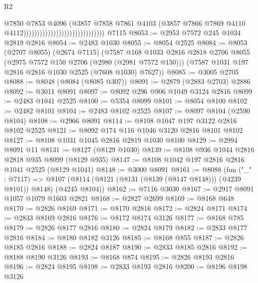 \begin{lexlean}{R2}
\begin{coremodule}
                                                            @7850
                                                            @7853
                                                            @4096
                                                            (@3857
                                                              @7858
                                                              @7861
                                                              @4103
                                                              (@3857
                                                                @7866
                                                                @7869
                                                                @4110
                                                                @4112))))))))))))))))))))))))))))))
    @7115
@8053 := @2953 @7572 @245 @1034 @2819 @2816
@8054 := @2483 @1030
@8055 := @8054 @2525
@8084 := @8053
    (@2707 @8055)
    (@2674 @7115)
    (@7587
      @168
      @1033
      @2816
      @2818
      @2706
      @8055
      (@2975 @7572 @150 @2706 (@2980 (@2981 @7572 @150)))
      (@7587 @1031 @197 @2816 @2816 @1030 @2525 (@7608 @1030) @7627))
@8085 := @3005 @2705
@8088 := @8048 (@8084 (@8085 @307))
@8091 := @2879 (@2883 @2703) @2886
@8092 := @3011 @8091
@8097 := @8092 @296 @906 @1049 @3124 @2816
@8099 := @2483 @1041 @2525
@8100 := @5354 @8099
@8101 := @8054 @8100
@8102 := @2482 @8101
@8104 := @2483 @8102 @2525
@8107 := @8097 @8104 (@2590 @8104)
@8108 := @2966 @8091
@8114 := @8108 @1047 @197 @3122 @2816 @8102 @2525
@8121 := @8092 @174 @116 @1046 @3120 @2816 @8101 @8102
@8127 := @8108 @1031 @1045 @2816 @2819 @1030 @8100
@8129 := @2994 @8091 @11
@8131 := @8127 (@8129 @1030)
@8139 := @8108 @936 @1044 @2816 @2818 @935 @8099 (@8129 @935)
@8147 := @8108 @1042 @197 @2816 @2816 @1041 @2525 (@8129 @1041)
@8148 := @3000 @8091
@8161 := @8088
    (fun ("_" : @7117) =>
    @8107 (@8114 (@8121 (@8131 (@8139 (@8147 @8148))) (@4239 @8101)) @8148) (@4245 @8104))
@8162 := @7116 @3030
@8167 := @2917 @8091 @1057 @1079 @1603 @2821
@8168 := @2827 @2699
@8169 := @8168 @648
@8170 := @2826 @8169
@8171 := @8170 @2816
@8172 := @2824 @8171
@8174 := @2833 @8169 @2816
@8176 := @8172 @8174 @3126
@8177 := @8168 @785
@8179 := @2826 @8177 @2816
@8180 := @2824 @8179
@8182 := @2833 @8177 @2816
@8184 := @8180 @8182 @3126
@8185 := @8168 @855
@8187 := @2826 @8185 @2816
@8188 := @2824 @8187
@8190 := @2833 @8185 @2816
@8192 := @8188 @8190 @3126
@8193 := @8168 @874
@8195 := @2826 @8193 @2816
@8196 := @2824 @8195
@8198 := @2833 @8193 @2816
@8200 := @8196 @8198 @3126

\end{coremodule}
\end{lexlean}
